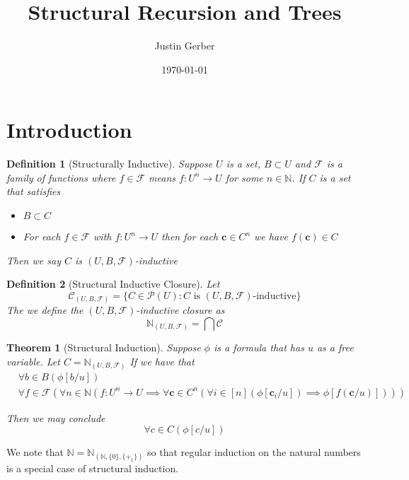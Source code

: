 \documentclass[12pt]{article}
\theoremstyle{break}
\newtheorem{definition}{Definition}[section]
\theoremstyle{break}
\newtheorem{theorem}{Theorem}[section]
\theoremstyle{break}
\theoremstyle{break}
\theoremstyle{break}
\newtheorem{informal definition}[definition]{Informal Definition}
\newcommand{\bv}[1]{\boldsymbol{#1}}
\begin{document}
\title{Structural Recursion and Trees}
\author{Justin Gerber}
\date{\today}
\maketitle

\section{Introduction}

\begin{definition}[Structurally Inductive]
Suppose $U$ is a set, $B\subset U$ and $\mathcal{F}$ is a family of functions where $f\in \mathcal{F}$ means $f:U^n \to U$ for some $n\in \mathbb{N}$.
If $C$ is a set that satisfies

\begin{itemize}
\item{$B\subset C$}
\item{For each $f\in \mathcal{F}$ with $f:U^n \to U$ then for each $\bv{c}\in C^n$ we have $f(\bv{c}) \in C$}
\end{itemize}

Then we say $C$ is $(U, B, \mathcal{F})$-inductive
\end{definition}

\begin{definition}[Structural Inductive Closure]
Let
$$
\mathcal{C}_{(U, B, \mathcal{F})} = \{C \in \mathcal{P}(U): C\text{ is }(U, B, \mathcal{F})\text{-inductive}\}
$$
The we define the $(U, B, \mathcal{F})$-inductive closure as
$$
\mathbb{N}_{(U, B, \mathcal{F})} = \bigcap \mathcal{C}
$$
\end{definition}

\begin{theorem}[Structural Induction]
Suppose $\phi$ is a formula that has $u$ as a free variable.
Let $C = \mathbb{N}_{(U, B, \mathcal{F})}$
If we have that
\begin{align*}
&\forall b \in B(\phi[b/u]) \\
&\forall f \in \mathcal{F}(\forall n \in \mathbb{N}(f:U^n \to U \implies \forall \bv{c} \in C^n(\forall i \in [n](\phi[\bv{c}_i/u])\implies \phi[f(\bv{c}/u)])))
\end{align*}

Then we may conclude
$$
\forall c \in C(\phi[c/u])
$$
\end{theorem}

We note that $\mathbb{N}=\mathbb{N}_{(\mathbb{N}, \{0\}, \{+_1\})}$ so that regular induction on the natural numbers is a special case of structural induction.
\end{document}
